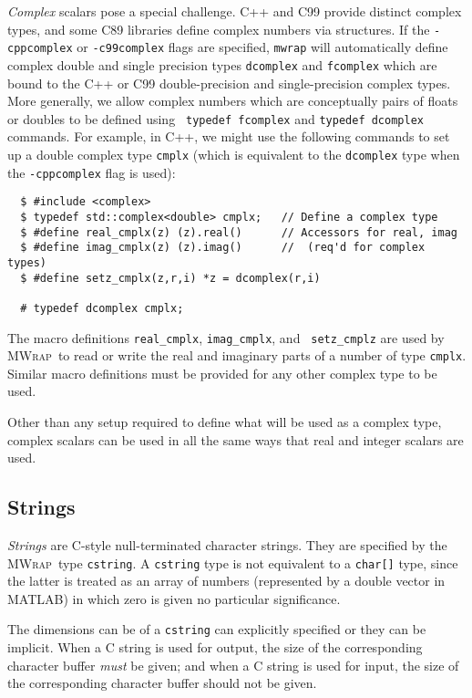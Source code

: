 \documentclass[12pt]{article}
\newcommand{\mwrap}{\textsc{MWrap}}
\begin{document}
{\it Complex} scalars pose a special challenge.  C++ and C99 provide
distinct complex types, and some C89 libraries define complex numbers
via structures.  If the {\tt -cppcomplex} or {\tt -c99complex} flags
are specified, {\tt mwrap} will automatically define complex double
and single precision types {\tt dcomplex} and {\tt fcomplex} which are
bound to the C++ or C99 double-precision and single-precision complex
types.  More generally, we allow complex numbers which are
conceptually pairs of floats or doubles to be defined using {\tt
  typedef fcomplex} and {\tt typedef dcomplex} commands.  For example,
in C++, we might use the following commands to set up a double complex
type {\tt cmplx} (which is equivalent to the {\tt dcomplex} type when
the {\tt -cppcomplex} flag is used):
\begin{verbatim}
  $ #include <complex>
  $ typedef std::complex<double> cmplx;   // Define a complex type
  $ #define real_cmplx(z) (z).real()      // Accessors for real, imag
  $ #define imag_cmplx(z) (z).imag()      //  (req'd for complex types)
  $ #define setz_cmplx(z,r,i) *z = dcomplex(r,i)

  # typedef dcomplex cmplx;
\end{verbatim}
The macro definitions {\tt real\_cmplx}, {\tt imag\_cmplx}, and {\tt
setz\_cmplz} are used by \mwrap\ to read or write the real and imaginary parts
of a number of type {\tt cmplx}.  Similar macro definitions must be provided
for any other complex type to be used.

Other than any setup required to define what will be used as a complex
type, complex scalars can be used in all the same ways that real and
integer scalars are used.


\subsection{Strings}

{\it Strings} are C-style null-terminated character strings.
They are specified by the \mwrap\ type {\tt cstring}.  A {\tt cstring}
type is not equivalent to a {\tt char[]} type, since the latter is
treated as an array of numbers (represented by a double vector in MATLAB)
in which zero is given no particular significance.

The dimensions can be of a {\tt cstring} can explicitly specified or
they can be implicit.  When a C string is used for output, the size
of the corresponding character buffer \emph{must} be given; and when
a C string is used for input, the size of the corresponding character
buffer should not be given.
\end{document}
